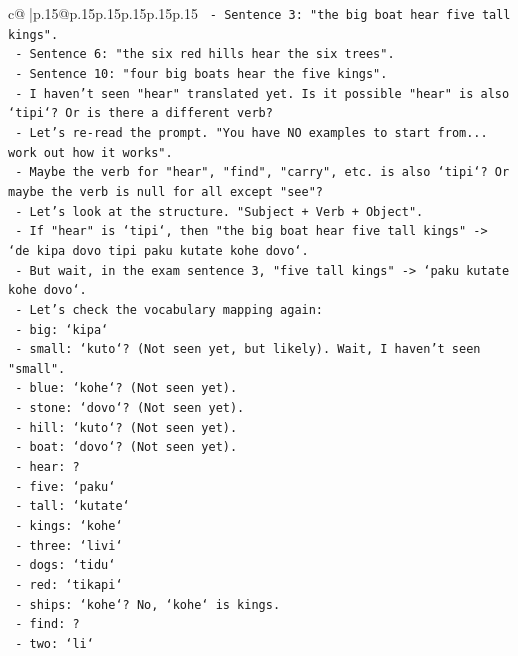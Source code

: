 \documentclass{article}
\begin{document}
{\begin{supertabular}{c@{$\;$}|p{.15\linewidth}@{}p{.15\linewidth}p{.15\linewidth}p{.15\linewidth}p{.15\linewidth}p{.15\linewidth}}
{{{\texttt{  {-} Sentence 3: "the big boat hear five tall kings".} \\
\texttt{  {-} Sentence 6: "the six red hills hear the six trees".} \\
\texttt{  {-} Sentence 10: "four big boats hear the five kings".} \\
\texttt{  {-} I haven't seen "hear" translated yet. Is it possible "hear" is also `tipi`? Or is there a different verb?} \\
\texttt{  {-} Let's re{-}read the prompt. "You have NO examples to start from... work out how it works".} \\
\texttt{  {-} Maybe the verb for "hear", "find", "carry", etc. is also `tipi`? Or maybe the verb is null for all except "see"?} \\
\texttt{  {-} Let's look at the structure. "Subject + Verb + Object".} \\
\texttt{  {-} If "hear" is `tipi`, then "the big boat hear five tall kings" {-}> `de kipa dovo tipi paku kutate kohe dovo`.} \\
\texttt{  {-} But wait, in the exam sentence 3, "five tall kings" {-}> `paku kutate kohe dovo`.} \\
\texttt{  {-} Let's check the vocabulary mapping again:} \\
\texttt{    {-} big: `kipa`} \\
\texttt{    {-} small: `kuto`? (Not seen yet, but likely). Wait, I haven't seen "small".} \\
\texttt{    {-} blue: `kohe`? (Not seen yet).} \\
\texttt{    {-} stone: `dovo`? (Not seen yet).} \\
\texttt{    {-} hill: `kuto`? (Not seen yet).} \\
\texttt{    {-} boat: `dovo`? (Not seen yet).} \\
\texttt{    {-} hear: ?} \\
\texttt{    {-} five: `paku`} \\
\texttt{    {-} tall: `kutate`} \\
\texttt{    {-} kings: `kohe`} \\
\texttt{    {-} three: `livi`} \\
\texttt{    {-} dogs: `tidu`} \\
\texttt{    {-} red: `tikapi`} \\
\texttt{    {-} ships: `kohe`? No, `kohe` is kings.} \\
\texttt{    {-} find: ?} \\
\texttt{    {-} two: `li`} \\
}}}
\end{supertabular}}
\end{document}
